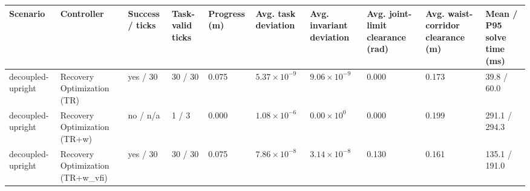 \begin{tabular}{llllllllll}
\toprule
Scenario & Controller & Success / ticks & Task-valid ticks & Progress (m) & Avg. task deviation & Avg. invariant deviation & Avg. joint-limit clearance (rad) & Avg. waist-corridor clearance (m) & Mean / P95 solve time (ms) \\
\midrule
decoupled-upright & Recovery Optimization (TR) & yes / 30 & 30 / 30 & 0.075 & $5.37\times 10^{-9}$ & $9.06\times 10^{-9}$ & 0.000 & 0.173 & 39.8 / 60.0 \\
decoupled-upright & Recovery Optimization (TR+w) & no / n/a & 1 / 3 & 0.000 & $1.08\times 10^{-6}$ & $0.00\times 10^{0}$ & 0.000 & 0.199 & 291.1 / 294.3 \\
decoupled-upright & Recovery Optimization (TR+w\_vfi) & yes / 30 & 30 / 30 & 0.075 & $7.86\times 10^{-8}$ & $3.14\times 10^{-8}$ & 0.130 & 0.161 & 135.1 / 191.0 \\
\bottomrule
\end{tabular}
